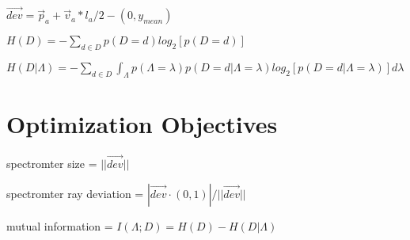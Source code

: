 \documentclass{article}
\begin{document}
$\vec{dev} = \vec{p}_a + \vec{v}_a * l_a / 2 - (0, y_{mean})$

$H(D) = -\sum_{d \in D}p(D=d) log_2[p(D=d)]$

$H(D|\Lambda) = -\sum_{d \in D}\int_{\Lambda}p(\Lambda=\lambda) p(D=d|\Lambda=\lambda) log_2[p(D=d|\Lambda=\lambda)] d\lambda$

\section{Optimization Objectives}

spectromter size = $||\vec{dev}||$

spectromter ray deviation = $| \vec{dev} \cdot (0, 1) | / ||\vec{dev}||$

mutual information = $I(\Lambda; D) = H(D) - H(D|\Lambda)$
\end{document}
